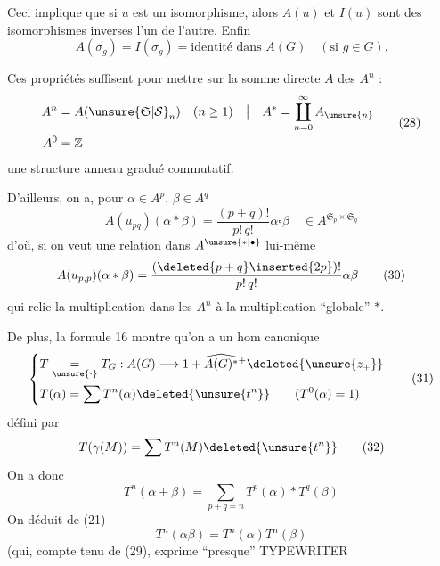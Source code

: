 Ceci implique que si $u$ est un isomorphisme, alors
$A(u)$ et $I(u)$ sont des isomorphismes inverses l'un
de l'autre. Enfin
\[
A(\sigma_g)=I(\sigma_g)=\text{identité dans } A(G)\quad(\text{si }g\in G). \tag*{(27)}
\]

Ces propriétés suffisent pour mettre sur la somme
directe $A$ des $A^n$ :
\[
\begin{aligned}
A^n&=A(\unsure{\mathfrak S|\mathcal S}_n)\quad(n\geq1)&\big|&& A^*&=\coprod_{n=0}^{\infty}A_{\unsure{n}}\\
A^0&=\mathbb Z
\end{aligned}\tag*{(28)}
\]
une structure  anneau gradué commutatif.

D'ailleurs, on a, pour $\alpha\in A^p$, $\beta\in A^q$
\[
A(u_{pq})(\alpha*\beta)=\frac{(p+q)!}{p!\,q!}\alpha\square\beta
\quad\in A^{\mathfrak S_p\times\mathfrak S_q} \tag*{(29)}
\]
d'où, si on veut une relation dans $A^{\unsure{*|\bullet}}$ lui-même
\[
A(u_{p,p})(\alpha*\beta)=\frac{(\deleted{p+q}\inserted{2p})!}{p!\,q!}\alpha\beta \tag*{(30)}
\]
qui relie la multiplication dans les $A^n$ 
à la multiplication ``globale'' $*$.

De plus, la formule 16 montre qu'on
a un hom canonique
\[
\left\{\begin{aligned}
&T\underset{\unsure{\cdot}}{=}T_G:A(G)\longrightarrow1+\widehat{A(G)^*}{}^+ \deleted{\unsure{z_+}}\\
&T(\alpha)=\sum T^n(\alpha)\deleted{\unsure{t^n}}\qquad(T^0(\alpha)=1)
\end{aligned}\right.\tag*{(31)}
\]
défini par
\[
T(\gamma(M))=\sum T^n(M)\deleted{\unsure{t^n}} \tag*{(32)}
\]
On a donc
\[
T^n(\alpha+\beta)=\sum_{p+q=n}T^p(\alpha)*T^q(\beta) \tag*{(33)}
\]
On déduit de (21)
\[
T^n(\alpha\beta)=T^n(\alpha)T^n(\beta) \tag*{(33)}
\]
(qui, compte tenu de (29), exprime ``presque''
  TYPEWRITER  
